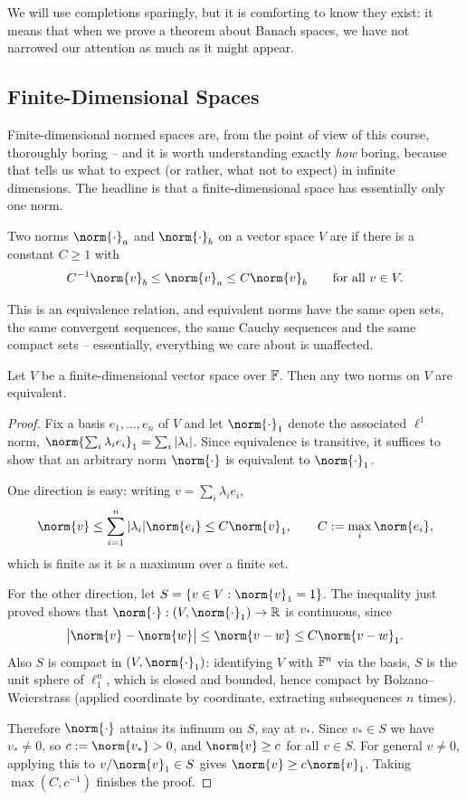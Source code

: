 \documentclass[a4paper]{scrartcl}
\begin{document}
We will use completions sparingly, but it is comforting to know they exist: it means that when we prove a theorem about Banach spaces, we have not narrowed our attention as much as it might appear.

\subsection{Finite-Dimensional Spaces}

Finite-dimensional normed spaces are, from the point of view of this course, thoroughly boring -- and it is worth understanding exactly \emph{how} boring, because that tells us what to expect (or rather, what not to expect) in infinite dimensions. The headline is that a finite-dimensional space has essentially only one norm.

\begin{definition}
	Two norms $\norm{\cdot}_a$ and $\norm{\cdot}_b$ on a vector space $V$ are  if there is a constant $C \geq 1$ with
	$$C^{-1} \norm{v}_b \leq \norm{v}_a \leq C \norm{v}_b \qquad \text{for all } v \in V.$$
\end{definition}

This is an equivalence relation, and equivalent norms have the same open sets, the same convergent sequences, the same Cauchy sequences and the same compact sets -- essentially, everything we care about is unaffected.

\begin{theorem}
	Let $V$ be a finite-dimensional vector space over $\mathbb{F}$. Then any two norms on $V$ are equivalent.
\end{theorem}

\begin{proof}
	Fix a basis $e_1, \dots, e_n$ of $V$ and let $\norm{\cdot}_1$ denote the associated $\ell^1$ norm, $\norm{\sum_i \lambda_i e_i}_1 = \sum_i |\lambda_i|$. Since equivalence is transitive, it suffices to show that an arbitrary norm $\norm{\cdot}$ is equivalent to $\norm{\cdot}_1$.

	One direction is easy: writing $v = \sum_i \lambda_i e_i$,
	$$\norm{v} \leq \sum_{i=1}^n |\lambda_i| \norm{e_i} \leq C \norm{v}_1, \qquad C := \max_i \norm{e_i},$$
	which is finite as it is a maximum over a finite set.

	For the other direction, let $S = \{v \in V : \norm{v}_1 = 1\}$. The inequality just proved shows that $\norm{\cdot} : (V, \norm{\cdot}_1) \to \R$ is continuous, since
	$$\big| \norm{v} - \norm{w} \big| \leq \norm{v - w} \leq C\norm{v-w}_1.$$
	Also $S$ is compact in $(V, \norm{\cdot}_1)$: identifying $V$ with $\mathbb{F}^n$ via the basis, $S$ is the unit sphere of $\ell_1^n$, which is closed and bounded, hence compact by Bolzano--Weierstrass (applied coordinate by coordinate, extracting subsequences $n$ times).

	Therefore $\norm{\cdot}$ attains its infimum on $S$, say at $v_*$. Since $v_* \in S$ we have $v_* \neq 0$, so $c := \norm{v_*} > 0$, and $\norm{v} \geq c$ for all $v \in S$. For general $v \neq 0$, applying this to $v / \norm{v}_1 \in S$ gives $\norm{v} \geq c \norm{v}_1$. Taking $\max(C, c^{-1})$ finishes the proof.
\end{proof}
\end{document}

